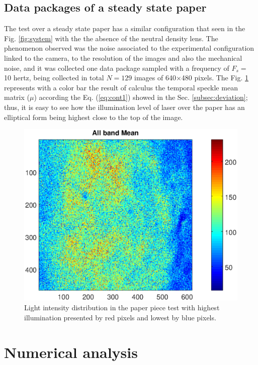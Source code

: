 \documentclass[review]{elsarticle}
\begin{document}
\subsection{Data packages of a steady state paper}
\label{sec:descriptionpaper}
The test over a steady state paper has a similar configuration that seen in
the Fig. \ref{fig:system} with the the absence of 
the neutral density lens. The phenomenon observed was the noise associated to the experimental configuration linked to the camera, to the resolution of the images and also the mechanical noise, and it was collected one data package
sampled with a frequency of $F_s=$ 10 hertz, being 
collected in total $N=129$ images of 640$\times$480 pixels.
The Fig. \ref{fig:meanpaper} represents
with a color bar the result of  calculus the temporal speckle mean matrix ($\mu$) according the Eq. (\ref{eq:cont1})
showed in the Sec. \ref{subsec:deviation}; thus, it is easy to see how the
illumination level of laser over the paper has an elliptical form being highest 
close to the top of the image.
\begin{figure}[h!]
\centering
\includegraphics[width=0.85\columnwidth]{meanall.eps}
\caption{Light intensity distribution in the paper piece test with highest illumination presented by red pixels and lowest by blue pixels.}
\label{fig:meanpaper}
\end{figure}

\section{Numerical analysis}
\label{sec:analysis}
\end{document}
